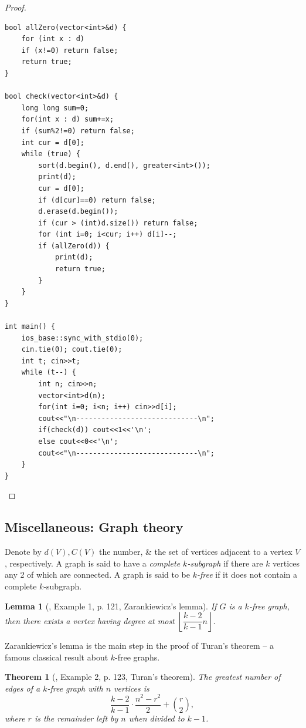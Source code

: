 \documentclass[oneside]{book}
\newtheorem{lemma}{Lemma}
\newtheorem{theorem}{Theorem}
\begin{document}
\begin{proof}
\begin{itemize}
\begin{itemize}
\begin{verbatim}
bool allZero(vector<int>&d) {
	for (int x : d)
	if (x!=0) return false;
	return true;
}

bool check(vector<int>&d) {
    long long sum=0;
    for(int x : d) sum+=x;
    if (sum%2!=0) return false;
    int cur = d[0];
    while (true) {
        sort(d.begin(), d.end(), greater<int>());
        print(d);
        cur = d[0];
        if (d[cur]==0) return false;
        d.erase(d.begin());
        if (cur > (int)d.size()) return false;
        for (int i=0; i<cur; i++) d[i]--;
        if (allZero(d)) {
            print(d);
            return true;
        }
    }
}

int main() {
    ios_base::sync_with_stdio(0);
    cin.tie(0); cout.tie(0);
    int t; cin>>t;
    while (t--) {
        int n; cin>>n;
        vector<int>d(n);
        for(int i=0; i<n; i++) cin>>d[i];
        cout<<"\n-----------------------------\n";
        if(check(d)) cout<<1<<'\n';
        else cout<<0<<'\n';
        cout<<"\n-----------------------------\n";
    }
}
\end{verbatim}
		\end{itemize}
	\end{itemize}
\end{proof}


\subsection{Miscellaneous: Graph theory}
Denote by $d(V),C(V)$ the number, \& the set of vertices adjacent to a vertex $V$, respectively. A graph is said to have a {\it complete $k$-subgraph} if there are $k$ vertices any 2 of which are connected. A graph is said to be {\it $k$-free} if it does not contain a complete $k$-subgraph.

\begin{lemma}[\cite{Andreescu_Dospinescu2010}, Example 1, p. 121, Zarankiewicz's lemma]
	If $G$ is a $k$-free graph, then there exists a vertex having degree at most $\left\lfloor\dfrac{k - 2}{k - 1}n\right\rfloor$.
\end{lemma}
Zarankiewicz's lemma is the main step in the proof of Turan's theorem -- a famous classical result about $k$-free graphs.

\begin{theorem}[\cite{Andreescu_Dospinescu2010}, Example 2, p. 123, Turan's theorem]
	The greatest number of edges of a $k$-free graph with $n$ vertices is
	\begin{equation*}
		\frac{k - 2}{k - 1}\cdot\frac{n^2 - r^2}{2} + \binom{r}{2},
	\end{equation*}
	where $r$ is the remainder left by $n$ when divided to $k - 1$.
\end{theorem}
\end{document}

